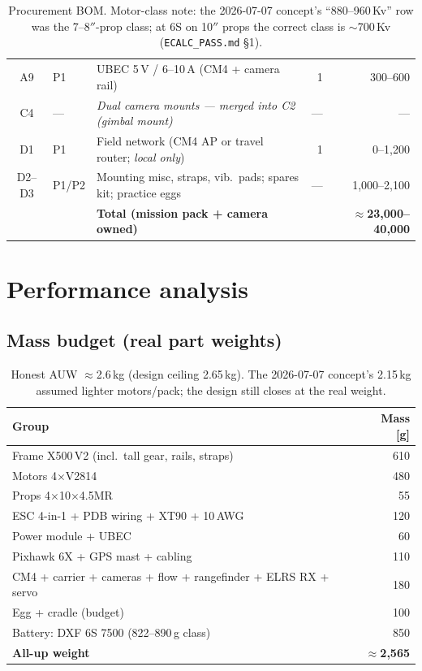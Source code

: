 \documentclass[11pt,a4paper]{article}
\begin{document}
\begin{table}[H]
\begin{tabularx}{\textwidth}{@{}clXrr@{}}
A9 & P1 & UBEC 5\,V / 6--10\,A (CM4 + camera rail) & 1 & 300--600 \\
C4 & --- & \emph{Dual camera mounts — merged into C2 (gimbal mount)} & --- & --- \\
D1 & P1 & Field network (CM4 AP or travel router; \emph{local only}) & 1 & 0--1{,}200 \\
D2--D3 & P1/P2 & Mounting misc, straps, vib.\ pads; spares kit; practice eggs & --- & 1{,}000--2{,}100 \\
\midrule
 & & \textbf{Total (mission pack + camera owned)} & & \textbf{$\approx$23{,}000--40{,}000} \\
\bottomrule
\end{tabularx}
\caption{Procurement BOM. Motor-class note: the 2026-07-07 concept's
``880--960\,Kv'' row was the 7--8$''$-prop class; at 6S on 10$''$ props the
correct class is $\sim$700\,Kv (\texttt{ECALC\_PASS.md} \S1).}
\end{table}

\clearpage
\section{Performance analysis}
\subsection{Mass budget (real part weights)}
\begin{table}[H]\centering\small
\begin{tabular}{@{}lr@{}}
\toprule
Group & Mass [g] \\
\midrule
Frame X500\,V2 (incl.\ tall gear, rails, straps) & 610 \\
Motors 4$\times$V2814 & 480 \\
Props 4$\times$10$\times$4.5MR & 55 \\
ESC 4-in-1 + PDB wiring + XT90 + 10\,AWG & 120 \\
Power module + UBEC & 60 \\
Pixhawk 6X + GPS mast + cabling & 110 \\
CM4 + carrier + cameras + flow + rangefinder + ELRS RX + servo & 180 \\
Egg + cradle (budget) & 100 \\
Battery: DXF 6S 7500 (822--890\,g class) & 850 \\
\midrule
\textbf{All-up weight} & \textbf{$\approx$2{,}565} \\
\bottomrule
\end{tabular}
\caption{Honest AUW $\approx$2.6\,kg (design ceiling 2.65\,kg). The 2026-07-07
concept's 2.15\,kg assumed lighter motors/pack; the design still closes at the
real weight.}
\end{table}
\end{document}
